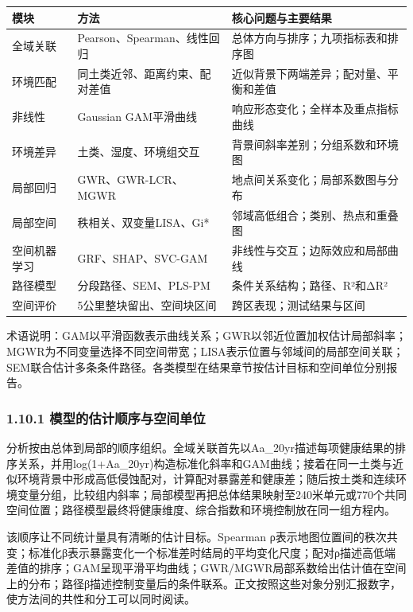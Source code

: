 \documentclass[
  11pt,
  a4paper,
]{ctexart}
\begin{document}
\begin{longtable}[]{@{}lll@{}}
\toprule
模块 & 方法 & 核心问题与主要结果 \\
\midrule
\endhead
全域关联 & Pearson、Spearman、线性回归 &
总体方向与排序；九项指标表和排序图 \\
环境匹配 & 同土类近邻、距离约束、配对差值 &
近似背景下两端差异；配对量、平衡和差值 \\
非线性 & Gaussian GAM平滑曲线 & 响应形态变化；全样本及重点指标曲线 \\
环境差异 & 土类、湿度、环境组交互 & 背景间斜率差别；分组系数和环境图 \\
局部回归 & GWR、GWR-LCR、MGWR & 地点间关系变化；局部系数图与分布 \\
局部空间 & 秩相关、双变量LISA、Gi* & 邻域高低组合；类别、热点和重叠图 \\
空间机器学习 & GRF、SHAP、SVC-GAM & 非线性与交互；边际效应和局部曲线 \\
路径模型 & 分段路径、SEM、PLS-PM & 条件关系结构；路径、R²和ΔR² \\
空间评价 & 5公里整块留出、空间块区间 & 跨区表现；测试结果与区间 \\
\bottomrule
\end{longtable}

术语说明：GAM以平滑函数表示曲线关系；GWR以邻近位置加权估计局部斜率；MGWR为不同变量选择不同空间带宽；LISA表示位置与邻域间的局部空间关联；SEM联合估计多条条件路径。各类模型在结果章节按估计目标和空间单位分别报告。

\hypertarget{ux6a21ux578bux7684ux4f30ux8ba1ux987aux5e8fux4e0eux7a7aux95f4ux5355ux4f4d}{%
\subsubsection{1.10.1
模型的估计顺序与空间单位}\label{ux6a21ux578bux7684ux4f30ux8ba1ux987aux5e8fux4e0eux7a7aux95f4ux5355ux4f4d}}

分析按由总体到局部的顺序组织。全域关联首先以Aa\_20yr描述每项健康结果的排序关系，并用log(1+Aa\_20yr)构造标准化斜率和GAM曲线；接着在同一土类与近似环境背景中形成高低侵蚀配对，计算配对暴露差和健康差；随后按土类和连续环境变量分组，比较组内斜率；局部模型再把总体结果映射至240米单元或770个共同空间位置；路径模型最终将健康维度、综合指数和环境控制放在同一组方程内。

该顺序让不同统计量具有清晰的估计目标。Spearman
ρ表示地图位置间的秩次共变；标准化β表示暴露变化一个标准差时结局的平均变化尺度；配对ρ描述高低端差值的排序；GAM呈现平滑平均曲线；GWR/MGWR局部系数给出估计值在空间上的分布；路径β描述控制变量后的条件联系。正文按照这些对象分别汇报数字，使方法间的共性和分工可以同时阅读。
\end{document}
